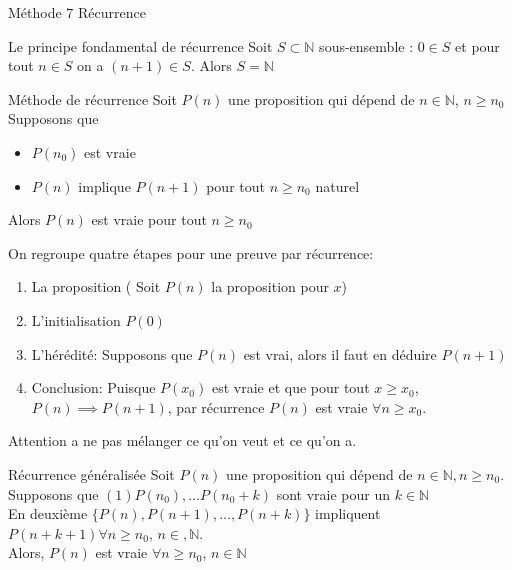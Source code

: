 
\begin{parag}{Méthode $7$ Récurrence}
    \begin{subparag}{Le principe fondamental de récurrence}
        Soit $S \subset \mathbb{N}$ sous-ensemble : $ 0 \in S$ et pour tout $n \in S$ on a $(n+1) \in S$. Alors $S = \mathbb{N}$
    \end{subparag}
    \begin{subparag}{Méthode de récurrence}
        Soit $P(n)$ une proposition qui dépend de $n \in \mathbb{N}$, $n \geq n_0$\\
Supposons que
        \begin{itemize}
            \item $P(n_0)$ est vraie
            \item $P(n)$ implique $P(n+1)$ pour tout $n \geq n_0$ naturel
        \end{itemize}
        Alors $P(n)$ est vraie pour tout $n \geq n_0$
    \end{subparag}
On regroupe quatre étapes pour une preuve par récurrence:
\begin{enumerate}
\item La proposition ( Soit $P(n)$ la proposition pour $x$)
\item L'initialisation $P(0)$
\item L'hérédité: Supposons que $P(n)$ est vrai, alors il faut en déduire $P(n+1)$
\item Conclusion: Puisque $P(x_0)$ est vraie et que pour tout $x \geq x_0$, $P(n) \implies P(n+1)$, par récurrence $P(n)$ est vraie $ \forall n \geq x_0$. 
    
\end{enumerate}
\begin{framedremark}
    Attention a ne pas mélanger ce qu'on veut et ce qu'on a.
\end{framedremark}

\end{parag}
\begin{parag}{Récurrence généralisée}
    Soit $P(n)$ une proposition qui dépend de $n \in \mathbb{N}, n \geq n_0$.\\
    Supposons que $(1) P(n_0), \dots P(n_0 + k)$ sont vraie pour un $k \in \mathbb{N}$\\
    En deuxième $\{ P(n), P(n+1), \dots, P(n+k)\}$ impliquent $P(n +k+1) \forall n \geq n_0$, $n \in , \mathbb{N}$.\\
    Alors, $P(n)$ est vraie $ \forall n \geq n_0$, $ n \in \mathbb{N}$
\end{parag}


